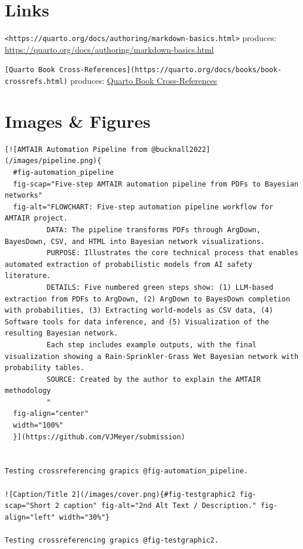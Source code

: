 \documentclass[
  11pt,
  letterpaper,
]{book}
\begin{document}
\section*{Links}\label{links}


\texttt{\textless{}https://quarto.org/docs/authoring/markdown-basics.html\textgreater{}}
produces: \url{https://quarto.org/docs/authoring/markdown-basics.html}

\texttt{{[}Quarto\ Book\ Cross-References{]}(https://quarto.org/docs/books/book-crossrefs.html)}
produces:
\href{https://quarto.org/docs/books/book-crossrefs.html}{Quarto Book
Cross-References}

\section*{Images \& Figures}\label{sec-figures1}


\begin{verbatim}
[![AMTAIR Automation Pipeline from @bucknall2022](/images/pipeline.png){
  #fig-automation_pipeline
  fig-scap="Five-step AMTAIR automation pipeline from PDFs to Bayesian networks" 
  fig-alt="FLOWCHART: Five-step automation pipeline workflow for AMTAIR project.
          DATA: The pipeline transforms PDFs through ArgDown, BayesDown, CSV, and HTML into Bayesian network visualizations.
          PURPOSE: Illustrates the core technical process that enables automated extraction of probabilistic models from AI safety literature.
          DETAILS: Five numbered green steps show: (1) LLM-based extraction from PDFs to ArgDown, (2) ArgDown to BayesDown completion with probabilities, (3) Extracting world-models as CSV data, (4) Software tools for data inference, and (5) Visualization of the resulting Bayesian network.
          Each step includes example outputs, with the final visualization showing a Rain-Sprinkler-Grass Wet Bayesian network with probability tables.
          SOURCE: Created by the author to explain the AMTAIR methodology
          "
  fig-align="center" 
  width="100%"
  }](https://github.com/VJMeyer/submission)


Testing crossreferencing grapics @fig-automation_pipeline.

![Caption/Title 2](/images/cover.png){#fig-testgraphic2 fig-scap="Short 2 caption" fig-alt="2nd Alt Text / Description." fig-align="left" width="30%"}

Testing crossreferencing grapics @fig-testgraphic2.
\end{verbatim}
\end{document}
